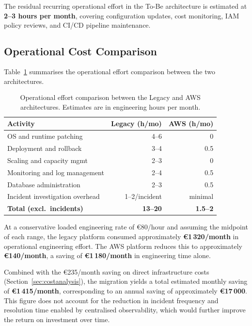 The residual recurring operational effort in the To-Be architecture is
estimated at \textbf{2--3 hours per month}, covering configuration
updates, cost monitoring, IAM policy reviews, and CI/CD pipeline
maintenance.

\subsection{Operational Cost Comparison}

Table~\ref{tab:operational_effort} summarises the operational effort
comparison between the two architectures.

\begin{table}[H]
  \centering
  \caption{Operational effort comparison between the Legacy and AWS
  architectures. Estimates are in engineering hours per month.}
  \label{tab:operational_effort}
  \small
  \begin{tabular}{lrr}
    \toprule
    \textbf{Activity} & \textbf{Legacy (h/mo)} & \textbf{AWS (h/mo)} \\
    \midrule
    OS and runtime patching      & 4--6  & 0   \\
    Deployment and rollback      & 3--4  & 0.5 \\
    Scaling and capacity mgmt    & 2--3  & 0   \\
    Monitoring and log management& 2--4  & 0.5 \\
    Database administration      & 2--3  & 0.5 \\
    Incident investigation overhead & 1--2/incident & minimal \\
    \midrule
    \textbf{Total (excl.\ incidents)} & \textbf{13--20} & \textbf{1.5--2} \\
    \bottomrule
  \end{tabular}
\end{table}

At a conservative loaded engineering rate of €80/hour and assuming the
midpoint of each range, the legacy platform consumed approximately
\textbf{€1\,320/month} in operational engineering effort.
The AWS platform reduces this to approximately \textbf{€140/month},
a saving of \textbf{€1\,180/month} in engineering time alone.

Combined with the €235/month saving on direct infrastructure costs
(Section~\ref{sec:costanalysis}), the migration yields a total
estimated monthly saving of \textbf{€1\,415/month}, corresponding to
an annual saving of approximately \textbf{€17\,000}.
This figure does not account for the reduction in incident frequency
and resolution time enabled by centralised observability, which would
further improve the return on investment over time.

